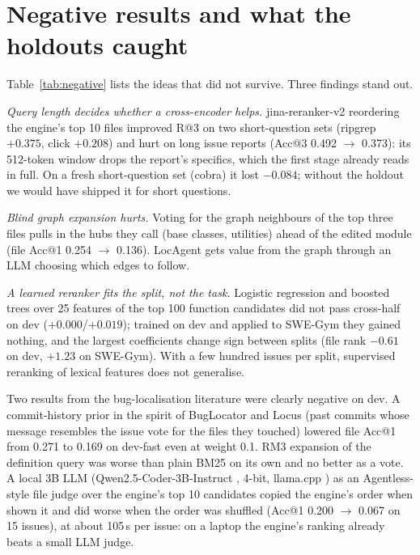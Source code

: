\documentclass[10pt,twocolumn]{article}
\makeatletter
\newcommand{\accat}[1]{Acc@#1}
\makeatother
\begin{document}
\section{Negative results and what the holdouts caught}
\label{sec:negative}



Table~\ref{tab:negative} lists the ideas that did not survive. Three findings stand out.

\emph{Query length decides whether a cross-encoder helps.} jina-reranker-v2 reordering the engine's
top 10 files improved R@3 on two short-question sets (ripgrep $+0.375$, click $+0.208$) and hurt on
long issue reports (\accat{3} 0.492 $\to$ 0.373): its 512-token window drops the report's specifics,
which the first stage already reads in full. On a fresh short-question set (cobra) it lost $-0.084$;
without the holdout we would have shipped it for short questions.

\emph{Blind graph expansion hurts.} Voting for the graph neighbours of the top three files pulls in
the hubs they call (base classes, utilities) ahead of the edited module (file \accat{1} 0.254
$\to$ 0.136). LocAgent gets value from the graph through an LLM choosing which edges to follow.

\emph{A learned reranker fits the split, not the task.} Logistic regression and boosted trees over 25
features of the top 100 function candidates did not pass cross-half on dev ($+0.000$/$+0.019$);
trained on dev and applied to SWE-Gym they gained nothing, and the largest coefficients change sign
between splits (file rank $-0.61$ on dev, $+1.23$ on SWE-Gym). With a few hundred issues per split,
supervised reranking of lexical features does not generalise.

Two results from the bug-localisation literature were clearly negative on dev. A commit-history prior
in the spirit of BugLocator and Locus (past commits whose message resembles the issue vote for the
files they touched) lowered file \accat{1} from 0.271 to 0.169 on dev-fast even at weight 0.1. RM3
expansion of the definition query was worse than plain BM25 on its own and no better as a vote.
A local 3B LLM (Qwen2.5-Coder-3B-Instruct \citep{hui2024qwen25coder}, 4-bit, llama.cpp
\citep{llamacpp}) as an Agentless-style file judge over the engine's top 10 candidates copied the engine's order when shown it and did worse
when the order was shuffled (\accat{1} 0.200 $\to$ 0.067 on 15 issues), at about 105\,s per issue:
on a laptop the engine's ranking already beats a small LLM judge.
\end{document}
